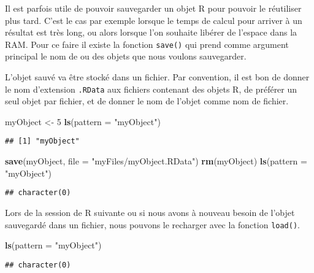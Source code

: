 \documentclass[]{book}
\newenvironment{Shaded}{\begin{snugshade}}{\end{snugshade}}
\newcommand{\KeywordTok}[1]{\textcolor[rgb]{0.13,0.29,0.53}{\textbf{#1}}}
\newcommand{\DataTypeTok}[1]{\textcolor[rgb]{0.13,0.29,0.53}{#1}}
\newcommand{\DecValTok}[1]{\textcolor[rgb]{0.00,0.00,0.81}{#1}}
\newcommand{\StringTok}[1]{\textcolor[rgb]{0.31,0.60,0.02}{#1}}
\newcommand{\NormalTok}[1]{#1}
\theoremstyle{definition}
\theoremstyle{definition}
\theoremstyle{definition}
\theoremstyle{remark}
\begin{document}
Il est parfois utile de pouvoir sauvegarder un objet R pour pouvoir le
réutiliser plus tard. C'est le cas par exemple lorsque le temps de
calcul pour arriver à un résultat est très long, ou alors lorsque l'on
souhaite libérer de l'espace dans la RAM. Pour ce faire il existe la
fonction \texttt{save()} qui prend comme argument principal le nom de ou
des objets que nous voulons sauvegarder.

L'objet sauvé va être stocké dans un fichier. Par convention, il est bon
de donner le nom d'extension \texttt{.RData} aux fichiers contenant des
objets R, de préférer un seul objet par fichier, et de donner le nom de
l'objet comme nom de fichier.

\begin{Shaded}
\begin{Highlighting}[]
\NormalTok{myObject <-}\StringTok{ }\DecValTok{5}
\KeywordTok{ls}\NormalTok{(}\DataTypeTok{pattern =} \StringTok{"myObject"}\NormalTok{)}
\end{Highlighting}
\end{Shaded}

\begin{verbatim}
## [1] "myObject"
\end{verbatim}

\begin{Shaded}
\begin{Highlighting}[]
\KeywordTok{save}\NormalTok{(myObject, }\DataTypeTok{file =} \StringTok{"myFiles/myObject.RData"}\NormalTok{)}
\KeywordTok{rm}\NormalTok{(myObject)}
\KeywordTok{ls}\NormalTok{(}\DataTypeTok{pattern =} \StringTok{"myObject"}\NormalTok{)}
\end{Highlighting}
\end{Shaded}

\begin{verbatim}
## character(0)
\end{verbatim}

Lors de la session de R suivante ou si nous avons à nouveau besoin de
l'objet sauvegardé dans un fichier, nous pouvons le recharger avec la
fonction \texttt{load()}.

\begin{Shaded}
\begin{Highlighting}[]
\KeywordTok{ls}\NormalTok{(}\DataTypeTok{pattern =} \StringTok{"myObject"}\NormalTok{)}
\end{Highlighting}
\end{Shaded}

\begin{verbatim}
## character(0)
\end{verbatim}
\end{document}
